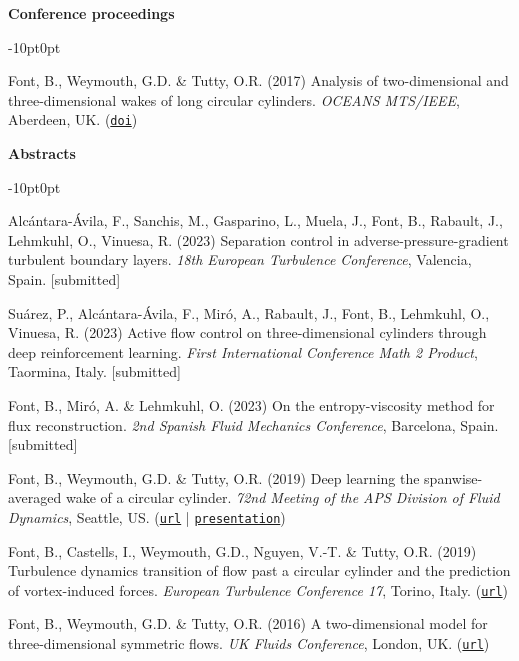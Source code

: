 \documentclass[line]{res}
\newenvironment{p}
  {\begin{adjustwidth}{-10pt}{0pt}}
  {\end{adjustwidth}}
\begin{document}
\begin{resume}
\hspace{-1cm}\textbf{Conference proceedings}\vspace{0.25cm}
\begin{p}
\begin{etaremune}[leftmargin=-2pt,parsep=5pt]
\item Font, B., Weymouth, G.D.  \&  Tutty, O.R. (2017) Analysis of two-dimensional and three-dimensional wakes of long circular cylinders. {\em OCEANS MTS/IEEE}, Aberdeen, UK. (\href{https://doi.org/10.1109/OCEANSE.2017.8084904}{\texttt{doi}})
\end{etaremune}
\end{p}

\hspace{-1cm}\textbf{Abstracts}\vspace{0.25cm}
\begin{p}
\begin{etaremune}[leftmargin=0pt,parsep=5pt]
\item Alcántara-Ávila, F., Sanchis, M., Gasparino, L., Muela, J., Font, B., Rabault, J., Lehmkuhl, O., Vinuesa, R. (2023) Separation control in adverse-pressure-gradient turbulent boundary layers. \textit{18th European Turbulence Conference}, Valencia, Spain. [submitted]
\item Suárez, P., Alcántara-Ávila, F., Miró, A., Rabault, J., Font, B., Lehmkuhl, O., Vinuesa, R. (2023) Active flow control on three-dimensional cylinders through deep reinforcement learning. \textit{First International Conference Math 2 Product}, Taormina, Italy. [submitted]
\item Font, B., Mir\'{o}, A. \& Lehmkuhl, O. (2023) On the entropy-viscosity method for flux reconstruction. \textit{2nd Spanish Fluid Mechanics Conference}, Barcelona, Spain. [submitted]
\item Font, B., Weymouth, G.D. \& Tutty, O.R. (2019) Deep learning the spanwise-averaged wake of a circular cylinder. \textit{72nd Meeting of the APS Division of Fluid Dynamics}, Seattle, US. (\href{https://meetings.aps.org/Meeting/DFD19/Session/L17.5}{\texttt{url}} | \href{https://github.com/b-fg/APS2019}{\texttt{presentation}})
\item Font, B., Castells, I., Weymouth, G.D., Nguyen, V.-T. \& Tutty, O.R. (2019) Turbulence dynamics transition of flow past a circular cylinder and the prediction of vortex-induced forces. \textit{European Turbulence Conference 17}, Torino, Italy. (\href{https://etc17.fyper.com/program/show_slot/41}{\texttt{url}})
\item Font, B., Weymouth, G.D.  \&  Tutty, O.R. (2016)  A two-dimensional model for three-dimensional symmetric flows. \textit{UK Fluids Conference}, London, UK. (\href{https://www.imperial.ac.uk/media/imperial-college/faculty-of-engineering/aeronautics/UK-Fluids-Conference-2016-booklet.pdf}{\texttt{url}})
\end{etaremune}
\end{p}


\end{resume}
\end{document}
